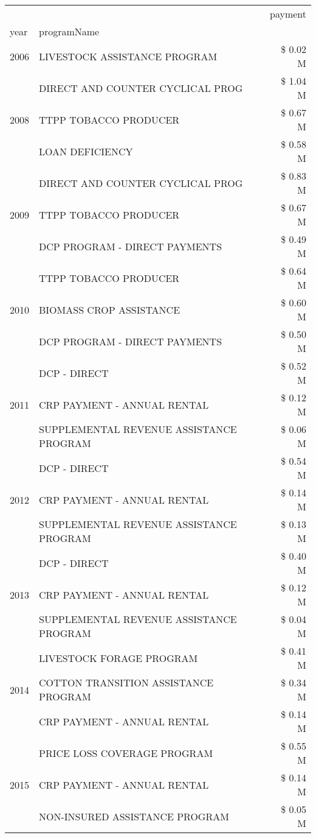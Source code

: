\begin{tabular}{llr}
\toprule
 &  & payment \\
year & programName &  \\
\midrule
2006 & LIVESTOCK ASSISTANCE PROGRAM & \$ 0.02 M \\
\cline{1-3}
\multirow[t]{3}{*}{2008} & DIRECT AND COUNTER CYCLICAL PROG & \$ 1.04 M \\
 & TTPP TOBACCO PRODUCER & \$ 0.67 M \\
 & LOAN DEFICIENCY & \$ 0.58 M \\
\cline{1-3}
\multirow[t]{3}{*}{2009} & DIRECT AND COUNTER CYCLICAL PROG & \$ 0.83 M \\
 & TTPP TOBACCO PRODUCER & \$ 0.67 M \\
 & DCP PROGRAM - DIRECT PAYMENTS & \$ 0.49 M \\
\cline{1-3}
\multirow[t]{3}{*}{2010} & TTPP TOBACCO PRODUCER & \$ 0.64 M \\
 & BIOMASS CROP ASSISTANCE & \$ 0.60 M \\
 & DCP PROGRAM - DIRECT PAYMENTS & \$ 0.50 M \\
\cline{1-3}
\multirow[t]{3}{*}{2011} & DCP - DIRECT & \$ 0.52 M \\
 & CRP PAYMENT - ANNUAL RENTAL & \$ 0.12 M \\
 & SUPPLEMENTAL REVENUE ASSISTANCE PROGRAM & \$ 0.06 M \\
\cline{1-3}
\multirow[t]{3}{*}{2012} & DCP - DIRECT & \$ 0.54 M \\
 & CRP PAYMENT - ANNUAL RENTAL & \$ 0.14 M \\
 & SUPPLEMENTAL REVENUE ASSISTANCE PROGRAM & \$ 0.13 M \\
\cline{1-3}
\multirow[t]{3}{*}{2013} & DCP - DIRECT & \$ 0.40 M \\
 & CRP PAYMENT - ANNUAL RENTAL & \$ 0.12 M \\
 & SUPPLEMENTAL REVENUE ASSISTANCE PROGRAM & \$ 0.04 M \\
\cline{1-3}
\multirow[t]{3}{*}{2014} & LIVESTOCK FORAGE PROGRAM & \$ 0.41 M \\
 & COTTON TRANSITION ASSISTANCE PROGRAM & \$ 0.34 M \\
 & CRP PAYMENT - ANNUAL RENTAL & \$ 0.14 M \\
\cline{1-3}
\multirow[t]{3}{*}{2015} & PRICE LOSS COVERAGE PROGRAM & \$ 0.55 M \\
 & CRP PAYMENT - ANNUAL RENTAL & \$ 0.14 M \\
 & NON-INSURED ASSISTANCE PROGRAM & \$ 0.05 M \\

\end{tabular}
